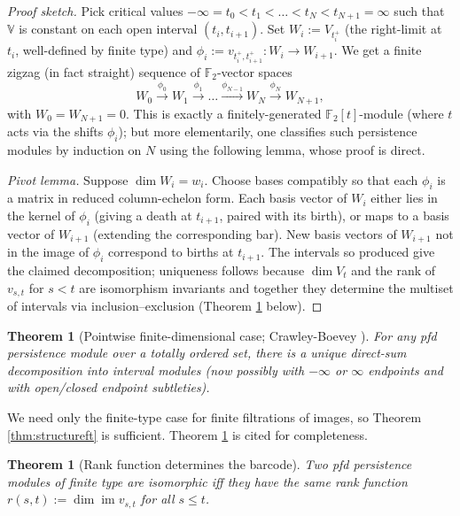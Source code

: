 \documentclass[11pt]{article}
\theoremstyle{persdef}
\newtheorem{theorem}[definition]{Theorem}
\newcommand{\F}{\mathbb{F}}
\newcommand{\Ftwo}{\F_2}
\DeclareMathOperator{\imop}{im}
\begin{document}
\begin{proof}[Proof sketch]
Pick critical values $-\infty=t_0<t_1<\dots<t_N<t_{N+1}=\infty$ such that $\mathbb{V}$ is constant on each open interval $(t_i,t_{i+1})$. Set $W_i := V_{t_i^+}$ (the right-limit at $t_i$, well-defined by finite type) and $\phi_i := v_{t_i^+,t_{i+1}^+} : W_i\to W_{i+1}$. We get a finite zigzag (in fact straight) sequence of $\Ftwo$-vector spaces
\[
W_0 \xrightarrow{\phi_0} W_1 \xrightarrow{\phi_1} \dots \xrightarrow{\phi_{N-1}} W_N \xrightarrow{\phi_N} W_{N+1},
\]
with $W_0=W_{N+1}=0$. This is exactly a finitely-generated $\Ftwo[t]$-module (where $t$ acts via the shifts $\phi_i$); but more elementarily, one classifies such persistence modules by induction on $N$ using the following lemma, whose proof is direct.

\smallskip
\noindent\emph{Pivot lemma.} Suppose $\dim W_i = w_i$. Choose bases compatibly so that each $\phi_i$ is a matrix in reduced column-echelon form. Each basis vector of $W_i$ either lies in the kernel of $\phi_i$ (giving a death at $t_{i+1}$, paired with its birth), or maps to a basis vector of $W_{i+1}$ (extending the corresponding bar). New basis vectors of $W_{i+1}$ not in the image of $\phi_i$ correspond to births at $t_{i+1}$. The intervals so produced give the claimed decomposition; uniqueness follows because $\dim V_t$ and the rank of $v_{s,t}$ for $s<t$ are isomorphism invariants and together they determine the multiset of intervals via inclusion--exclusion (Theorem \ref{thm:rankequal} below).
\end{proof}

\begin{theorem}[Pointwise finite-dimensional case; Crawley-Boevey \cite{CB15}]\label{thm:structurepfd}
For any pfd persistence module over a totally ordered set, there is a unique direct-sum decomposition into interval modules (now possibly with $-\infty$ or $\infty$ endpoints and with open/closed endpoint subtleties).
\end{theorem}

\noindent
We need only the finite-type case for finite filtrations of images, so Theorem \ref{thm:structureft} is sufficient. Theorem \ref{thm:structurepfd} is cited for completeness.

\begin{theorem}[Rank function determines the barcode]\label{thm:rankequal}
Two pfd persistence modules of finite type are isomorphic iff they have the same \emph{rank function} $r(s,t) := \dim\imop v_{s,t}$ for all $s\leq t$.
\end{theorem}
\end{document}
